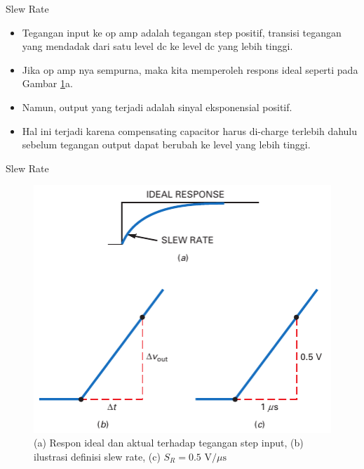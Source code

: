 \begin{frame}{Slew Rate}
	\begin{itemize}
		\item Tegangan input ke op amp adalah tegangan step positif, transisi tegangan yang mendadak dari satu level dc ke level dc yang lebih tinggi.
		\item Jika op amp nya sempurna, maka kita memperoleh respons ideal seperti pada Gambar \ref{fig-16.08}a.
		\item Namun, output yang terjadi adalah sinyal eksponensial positif.
		\item Hal ini terjadi karena compensating capacitor harus di-charge terlebih dahulu sebelum tegangan output dapat berubah ke level yang lebih tinggi.
	\end{itemize}
\end{frame}

\begin{frame}{Slew Rate}
	\begin{figure}
		\centering
		\includegraphics[height=0.7\textheight]{gambar/fig-16.08}
		\caption{(a) Respon ideal dan aktual terhadap tegangan step input, (b) ilustrasi definisi slew rate, (c) $ S_R = 0.5 \text{ V/}\mu\text{s} $}
		\label{fig-16.08}
	\end{figure}
\end{frame}


